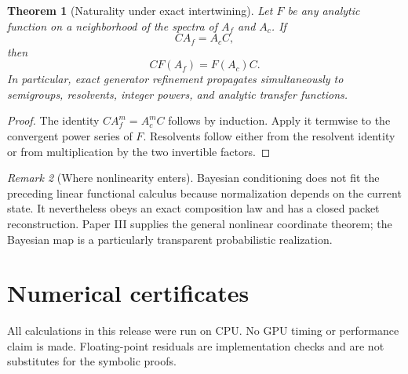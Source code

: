 \documentclass[11pt]{article}
\newtheorem{theorem}{Theorem}[section]
\theoremstyle{definition}
\theoremstyle{remark}
\newtheorem{remark}[theorem]{Remark}
\begin{document}
\begin{theorem}[Naturality under exact intertwining]
Let $F$ be any analytic function on a neighborhood of the spectra of $A_f$ and $A_c$. If
\[
CA_f=A_cC,
\]
then
\[
\boxed{CF(A_f)=F(A_c)C.}
\]
In particular, exact generator refinement propagates simultaneously to semigroups, resolvents, integer powers, and analytic transfer functions.
\end{theorem}

\begin{proof}
The identity $CA_f^m=A_c^mC$ follows by induction. Apply it termwise to the convergent power series of $F$. Resolvents follow either from the resolvent identity or from multiplication by the two invertible factors.
\end{proof}

\begin{remark}[Where nonlinearity enters]
Bayesian conditioning does not fit the preceding linear functional calculus because normalization depends on the current state. It nevertheless obeys an exact composition law and has a closed packet reconstruction. Paper III supplies the general nonlinear coordinate theorem; the Bayesian map is a particularly transparent probabilistic realization.
\end{remark}

\section{Numerical certificates}

All calculations in this release were run on CPU. No GPU timing or performance claim is made. Floating-point residuals are implementation checks and are not substitutes for the symbolic proofs.
\end{document}
